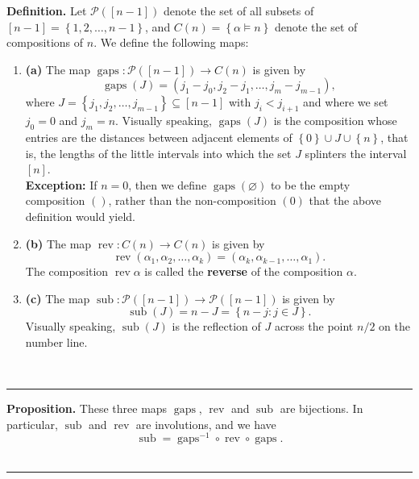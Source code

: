 \documentclass[12pt]{article}
\theoremstyle{definition}%
\newtheorem{prop}[thm]{Proposition}
\theoremstyle{definition}%
\newtheorem{defn}[thm]{Definition}
\theoremstyle{remark}%
\newcommand{\tup}[1]{\left( #1 \right)}
\newcommand{\interval}[1]{\left[ #1 \right]} %
\newcommand{\set}[1]{\left\{ #1 \right\}}
\newcommand{\gaps}{\operatorname{gaps}}
\newcommand{\sub}{\operatorname{sub}}
\newcommand{\rev}{\operatorname{rev}}
\newcommand{\defin}[1]{\textbf{#1}}
\newenvironment{prop}[1][Proposition]{\noindent\textbf{#1.} }{\ \rule{0.5em}{0.5em}}
\newenvironment{defn}[1][Definition]{\noindent\textbf{#1.} }{\ \rule{0.5em}{0.5em}}
\begin{document}
\begin{defn}
  Let $\mathcal{P}\tup{\interval{n-1}}$ denote the set of all subsets of $\interval{n-1} = \set{1,2,\dots,n-1}$,
  and $C\tup{n} = \set{ \alpha \models n}$ denote the set of compositions of $n$.
  We define the following maps:
    \begin{enumerate}[]
        \item\textbf{(a)} The map $\gaps : \mathcal{P}\tup{\interval{n-1}} \to C\tup{n}$ is given by
        \[
        \gaps\tup{J}=\tup{j_{1}-j_0,j_{2}-j_{1},\dots,j_m-j_{m-1}},
        \]
        where $J = \set{j_{1},j_{2},\dots,j_{m-1}} \subseteq \interval{n-1}$ with $j_{i} < j_{i+1}$ and where we set $j_0 = 0$ and $j_m=n$.
		Visually speaking, $\gaps\tup{J}$ is the composition whose entries are the distances between adjacent elements of $\set{0} \cup J \cup \set{n}$, that is, the lengths of the little intervals into which the set $J$ splinters the interval $\interval{n}$.
        \\
        \textbf{Exception:} If $n = 0$, then we define $\gaps\tup{\varnothing}$ to be the empty composition $\tup{}$, rather than the non-composition $\tup{0}$ that the above definition would yield.
        \item\textbf{(b)} The map $\rev : C\tup{n} \to C\tup{n}$ is given by
        \[
        \rev\tup{\alpha_1, \alpha_2, \dots, \alpha_k} = \tup{\alpha_k, \alpha_{k-1}, \dots, \alpha_1}.
        \]
		The composition $\rev \alpha$ is called the \defin{reverse} of the composition $\alpha$.
        \item\textbf{(c)} The map $\sub : \mathcal{P}\tup{\interval{n-1}} \to \mathcal{P}\tup{\interval{n-1}}$ is given by
        \[
        \sub\tup{J}=n-J = \set{n - j : j \in J}.
        \]
		Visually speaking, $\sub\tup{J}$ is the reflection of $J$ across the point $n/2$ on the number line.
\end{enumerate}

\end{defn}

\begin{prop}
    These three maps $\gaps$, $\rev$ and $\sub$ are bijections.
	In particular, $ \sub$ and $\rev $ are involutions, and we have
    \begin{equation}
    \label{eq.sub.1}
    \sub = \gaps^{-1} \circ \rev \circ \gaps .
    \end{equation}
\end{prop}
\end{document}
